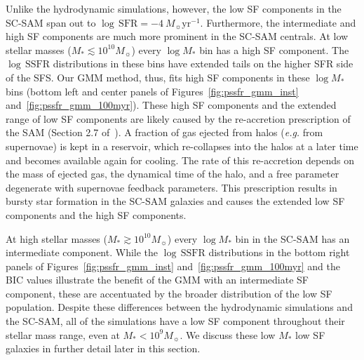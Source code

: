 \documentclass[tighten, preprint]{aastex62}
\begin{document}
Unlike the hydrodynamic simulations, however, the low SF components in the 
SC-SAM span out to $\log\,\mathrm{SFR}{=}{-}4\ M_\sun \mathrm{yr}^{-1}$. Furthermore, the intermediate 
and high SF components are much more prominent in the SC-SAM centrals. 
At low stellar masses ($M_* \lesssim 10^{10}M_\sun$) every $\log M_*$ 
bin has a high SF component. The $\log\,\mathrm{SSFR}$ distributions in these 
bins have extended tails on the higher SFR side of the SFS. Our GMM 
method, thus, fits high SF components in these $\log M_*$ bins (bottom left 
and center panels of Figures~\ref{fig:pssfr_gmm_inst} and~\ref{fig:pssfr_gmm_100myr}). 
These high SF components and the extended range of low SF components are likely 
caused by the re-accretion prescription of the SAM (Section 2.7 of~\citealt{somerville2008a}).
A fraction of gas ejected from halos (\emph{e.g.} from supernovae) is kept in 
a reservoir, which re-collapses into the halos at a later time and becomes available 
again for cooling. The rate of this re-accretion depends on the mass of ejected gas, 
the dynamical time of the halo, and a free parameter degenerate with supernovae 
feedback parameters. This prescription results in bursty 
star formation in the SC-SAM galaxies and causes the extended low SF components and 
the high SF components. %


At high stellar masses ($M_* \gtrsim 10^{10}M_\sun$) every $\log M_*$ bin in the 
SC-SAM has an intermediate component. While the $\log\,\mathrm{SSFR}$ 
distributions in the bottom right panels of Figures~\ref{fig:pssfr_gmm_inst} 
and~\ref{fig:pssfr_gmm_100myr} and the BIC values illustrate the benefit of the 
GMM with an intermediate SF component, these are accentuated by the broader 
distribution of the low SF population. Despite these differences between the 
hydrodynamic simulations and the SC-SAM, all of the simulations have a low SF 
component throughout their stellar mass 
range, even at $M_* < 10^9M_\sun$. We discuss these low $M_*$ low SF galaxies 
in further detail later in this section.
\end{document}
